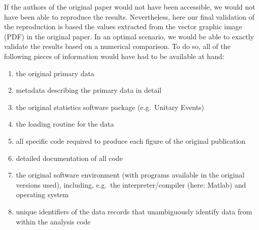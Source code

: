 \documentclass[10pt,a4paper,onecolumn]{article}
\begin{document}
If the authors of the original paper would not have been accessible, we
would not have been able to reproduce the results. Nevertheless, here
our final validation of the reproduction is based the values extracted
from the vector graphic image (PDF) in the original paper. In an optimal
scenario, we would be able to exactly validate the results based on a
numerical comparison. To do so, all of the following pieces of
information would have had to be available at hand:

\begin{enumerate}
\def\labelenumi{\arabic{enumi}.}
\item
  the original primary data
\item
  metadata describing the primary data in detail
\item
  the original statistics software package (e.g.~Unitary Events)
\item
  the loading routine for the data
\item
  all specific code required to produce each figure of the original
  publication
\item
  detailed documentation of all code
\item
  the original software environment (with programs available in the
  original versions used), including, e.g.~the interpreter/compiler
  (here: Matlab) and operating system
\item
  unique identifiers of the data records that unambiguously identify
  data from within the analysis code
\end{enumerate}
\end{document}
